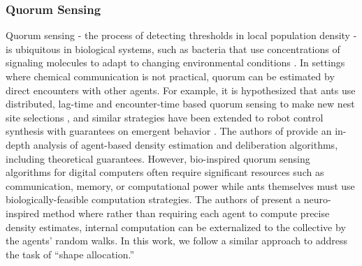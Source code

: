 \documentclass[runningheads]{llncs}
\begin{document}
\subsubsection{Quorum Sensing} Quorum sensing - the process of detecting thresholds in local population density - is ubiquitous in biological systems, such as bacteria that use concentrations of signaling molecules to adapt to changing environmental conditions \cite{bassler1999bacteria}. In settings where chemical communication is not practical, quorum can be estimated by direct encounters with other agents. For example, it is hypothesized that ants use distributed, lag-time and encounter-time based quorum sensing to make new nest site selections \cite{franks2002information}, and similar strategies have been extended to robot control synthesis with guarantees on emergent behavior \cite{berman2007algorithms}. The authors of \cite{musco2016ant} provide an in-depth analysis of agent-based density estimation and deliberation algorithms, including theoretical guarantees. However, bio-inspired quorum sensing algorithms for digital computers often require significant resources such as communication, memory, or computational power while ants themselves must use biologically-feasible computation strategies. The authors of \cite{pavlic2021quorum} present a neuro-inspired method where rather than requiring each agent to compute precise density estimates, internal computation can be externalized to the collective by the agents' random walks. In this work, we follow a similar approach to address the task of ``shape allocation.''
\end{document}
